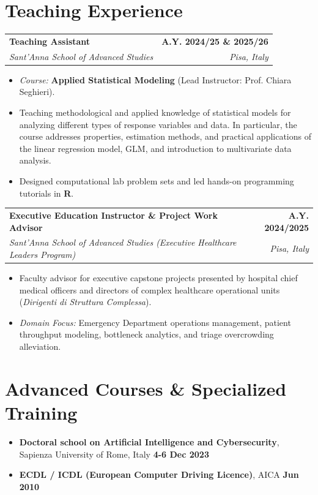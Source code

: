\documentclass[10pt,a4paper]{article}
\makeatletter
\newcommand{\cventry}[5]{
  \vspace{2pt}
  \noindent
  \begin{tabularx}{\textwidth}{@{}X r@{}}
    \textbf{#1} & \textcolor{secondary}{\textbf{#2}} \\
    \textit{#3} & \textit{\textcolor{textdark}{#4}}
  \end{tabularx}
  \vspace{-1pt}
  {\small #5}
  \vspace{2pt}
}
\makeatother
\begin{document}
\section{Teaching Experience}

\cventry{Teaching Assistant}{A.Y. 2024/25 \& 2025/26}
{Sant'Anna School of Advanced Studies}{Pisa, Italy}
{
\begin{itemize}
    \item \textit{Course:} \textbf{Applied Statistical Modeling} (Lead Instructor: Prof. Chiara Seghieri).
    \item Teaching methodological and applied knowledge of statistical models for analyzing different types of response variables and data. In particular, the course addresses properties, estimation methods, and practical applications of the linear regression model, GLM, and  introduction to multivariate data analysis.
    \item Designed computational lab problem sets and led hands-on programming tutorials in \textbf{R}.
\end{itemize}
}

\cventry{Executive Education Instructor \& Project Work Advisor}{A.Y. 2024/2025}
{Sant'Anna School of Advanced Studies (Executive Healthcare Leaders Program)}{Pisa, Italy}
{
\begin{itemize}
    \item Faculty advisor for executive capstone projects presented by hospital chief medical officers and directors of complex healthcare operational units (\textit{Dirigenti di Struttura Complessa}).
    \item \textit{Domain Focus:} Emergency Department operations management, patient throughput modeling, bottleneck analytics, and triage overcrowding alleviation.
\end{itemize}
}

\section{Advanced Courses \& Specialized Training}
\begin{itemize}
    \item \textbf{Doctoral school on Artificial Intelligence and Cybersecurity}, Sapienza University of Rome, Italy \hfill \textcolor{secondary}{\textbf{4-6 Dec 2023}}
    \item \textbf{ECDL / ICDL (European Computer Driving Licence)}, AICA \hfill \textcolor{secondary}{\textbf{Jun 2010}}
\end{itemize}
\end{document}
